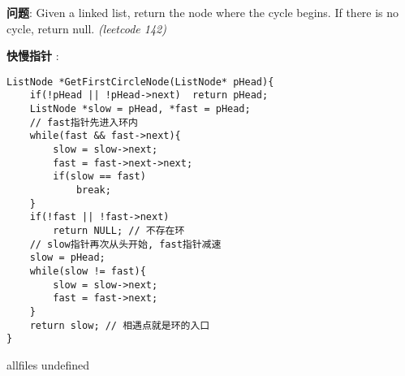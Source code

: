 \documentclass{article}
\begin{document}
\begin{CJK}{UTF8}{gbsn}     %

\else
    
\begin{description}
    \item{\textbf{问题}}: Given a linked list, return the node where the cycle begins. If there is no cycle, return null. \textit{(leetcode 142)}
    \item{\textbf{快慢指针}} : 
    \\
    \begin{lstlisting}
ListNode *GetFirstCircleNode(ListNode* pHead){
	if(!pHead || !pHead->next)	return pHead;
	ListNode *slow = pHead, *fast = pHead;
	// fast指针先进入环内
	while(fast && fast->next){
		slow = slow->next;
		fast = fast->next->next;
		if(slow == fast)
			break;
	}
	if(!fast || !fast->next)	
		return NULL; // 不存在环
	// slow指针再次从头开始, fast指针减速
	slow = pHead;
	while(slow != fast){
		slow = slow->next;
		fast = fast->next;
	}
	return slow; // 相遇点就是环的入口
}
    \end{lstlisting}
\end{description}

\fi

\ifx allfiles undefined
\end{CJK}
\end{document}
